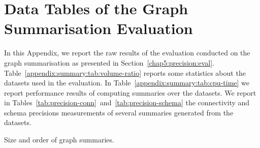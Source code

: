 \chapter{Data Tables of the Graph Summarisation Evaluation}

In this Appendix, we report the raw results of the evaluation conducted on the graph summarisation as presented in Section~\ref{chap5:precision:eval}. Table~\ref{appendix:summary:tab:volume-ratio} reports some statistics about the datasets used in the evaluation. In Table~\ref{appendix:summary:tab:cpu-time} we report performance results of computing summaries over the datasets. We report in Tables~\ref{tab:precision-conn}~and~\ref{tab:precision-schema} the \gls{connectivity} and \gls{schema} precisions measurements of several summaries generated from the datasets.

\begin{table}
	\centering
	\resizebox{\textwidth}{!}{
		
	}
	\caption{Size and order of graph summaries.}
	\label{appendix:summary:tab:volume-ratio}
\end{table}

\begin{table}
	\centering
	\resizebox{\textwidth}{!}{
		
	}
	\caption[Computational performance of graph summaries creation]{Performance comparison. We report the CPU time in $ms$ of the \emph{edges} step in the graph summarisation computation. For each category of dataset complexity, we report the mean $\mu$ of the CPU time.%
	}
	\label{appendix:summary:tab:cpu-time}
\end{table}





